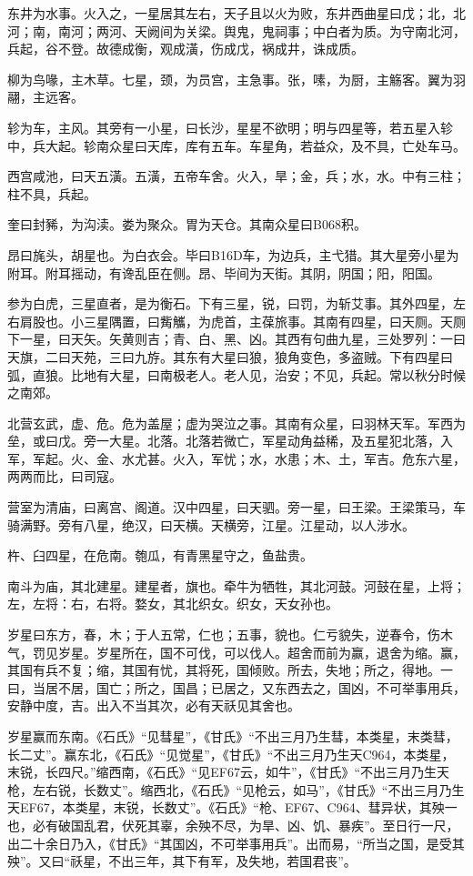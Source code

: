 \documentclass[]{article}
\begin{document}
东井为水事。火入之，一星居其左右，天子且以火为败，东井西曲星曰戊；北，北河；南，南河；两河、天阙间为关梁。舆鬼，鬼祠事；中白者为质。为守南北河，兵起，谷不登。故德成衡，观成潢，伤成戊，祸成井，诛成质。

柳为鸟喙，主木草。七星，颈，为员宫，主急事。张，嗉，为厨，主觞客。翼为羽翮，主远客。

轸为车，主风。其旁有一小星，曰长沙，星星不欲明；明与四星等，若五星入轸中，兵大起。轸南众星曰天库，库有五车。车星角，若益众，及不具，亡处车马。

西宫咸池，曰天五潢。五潢，五帝车舍。火入，旱；金，兵；水，水。中有三柱；柱不具，兵起。

奎曰封豨，为沟渎。娄为聚众。胃为天仓。其南众星曰B068积。

昂曰旄头，胡星也。为白衣会。毕曰B16D车，为边兵，主弋猎。其大星旁小星为附耳。附耳摇动，有谗乱臣在侧。昂、毕间为天街。其阴，阴国；阳，阳国。

参为白虎，三星直者，是为衡石。下有三星，锐，曰罚，为斩艾事。其外四星，左右肩股也。小三星隅置，曰觜觿，为虎首，主葆旅事。其南有四星，曰天厕。天厕下一星，曰天矢。矢黄则吉；青、白、黑、凶。其西有句曲九星，三处罗列：一曰天旗，二曰天苑，三曰九斿。其东有大星曰狼，狼角变色，多盗贼。下有四星曰弧，直狼。比地有大星，曰南极老人。老人见，治安；不见，兵起。常以秋分时候之南郊。

北营玄武，虚、危。危为盖屋；虚为哭泣之事。其南有众星，曰羽林天军。军西为垒，或曰戊。旁一大星。北落。北落若微亡，军星动角益稀，及五星犯北落，入军，军起。火、金、水尤甚。火入，军忧；水，水患；木、土，军吉。危东六星，两两而比，曰司寇。

营室为清庙，曰离宫、阁道。汉中四星，曰天驷。旁一星，曰王梁。王梁策马，车骑满野。旁有八星，绝汉，曰天横。天横旁，江星。江星动，以人涉水。

杵、臼四星，在危南。匏瓜，有青黑星守之，鱼盐贵。

南斗为庙，其北建星。建星者，旗也。牵牛为牺牲，其北河鼓。河鼓在星，上将；左，左将：右，右将。婺女，其北织女。织女，天女孙也。

岁星曰东方，春，木；于人五常，仁也；五事，貌也。仁亏貌失，逆春令，伤木气，罚见岁星。岁星所在，国不可伐，可以伐人。超舍而前为赢，退舍为缩。赢，其国有兵不复；缩，其国有忧，其将死，国倾败。所去，失地；所之，得地。一曰，当居不居，国亡；所之，国昌；已居之，又东西去之，国凶，不可举事用兵，安静中度，吉。出入不当其次，必有天祅见其舍也。

岁星赢而东南。《石氏》``见彗星''，《甘氏》``不出三月乃生彗，本类星，末类彗，长二丈''。赢东北，《石氏》``见觉星''，《甘氏》``不出三月乃生天C964，本类星，末锐，长四尺。''缩西南，《石氏》``见EF67云，如牛''，《甘氏》``不出三月乃生天枪，左右锐，长数丈''。缩西北，《石氏》``见枪云，如马''，《甘氏》``不出三月乃生天EF67，本类星，末锐，长数丈''。《石氏》``枪、EF67、C964、彗异状，其殃一也，必有破国乱君，伏死其辜，余殃不尽，为旱、凶、饥、暴疾''。至日行一尺，出二十余日乃入，《甘氏》``其国凶，不可举事用兵''。出而易，``所当之国，是受其殃''。又曰``祅星，不出三年，其下有军，及失地，若国君丧''。
\end{document}
